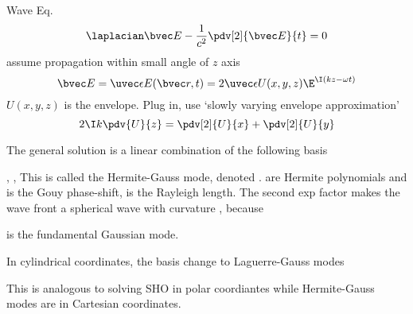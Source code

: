 
Wave Eq.
\begin{equation}
\laplacian \bvec E - \frac{1}{c^2} \pdv[2]{\bvec E}{t} = 0
\end{equation}
assume propagation within small angle of $z$ axis
\begin{equation}
\bvec E = \uvec \epsilon E(\bvec r, t) = 2\uvec \epsilon U(x, y, z) \E^{\I (kz - \omega t)}
\end{equation}
$U(x, y, z)$ is the envelope. Plug in, use ‘slowly varying envelope approximation’
\begin{equation}
2\I k\pdv{U}{z} = \pdv[2]{U}{x} + \pdv[2]{U}{y}
\end{equation}

The general solution is a linear combination of the following basis
  
 
       
 ,  ,   
This is called the Hermite-Gauss mode, denoted  .  are Hermite polynomials and   is the Gouy phase-shift,   is the Rayleigh length. The second exp factor makes the wave front a spherical wave with curvature  , because
 




  is the fundamental Gaussian mode.

In cylindrical coordinates, the basis change to Laguerre-Gauss modes  
 
  
This is analogous to solving SHO in polar coordiantes while Hermite-Gauss modes are in Cartesian coordinates. 
